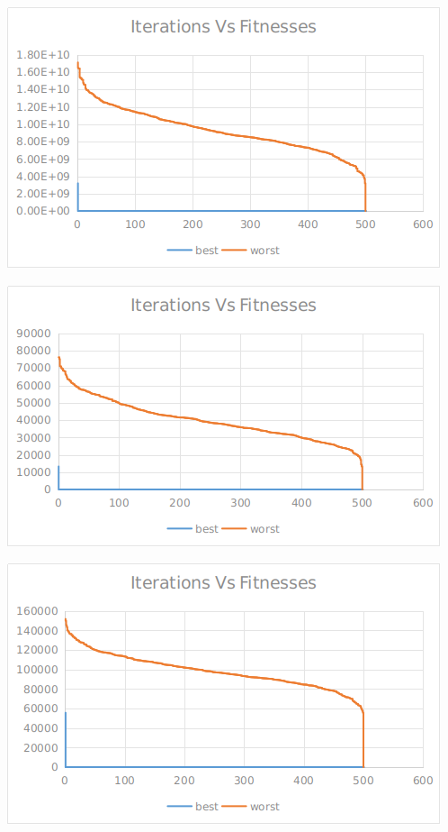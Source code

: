 \documentclass[12pt]{article}
\begin{document}
					\begin{minipage}{0.6\linewidth}
						\includegraphics[width=\linewidth]{51.png}
					\end{minipage}
					\hfill
					\begin{minipage}{0.6\linewidth}
						\includegraphics[width=\linewidth]{52.png}
					\end{minipage}
					\begin{minipage}{0.6\linewidth}
						\includegraphics[width=\linewidth]{53.png}
					\end{minipage}
\end{document}
